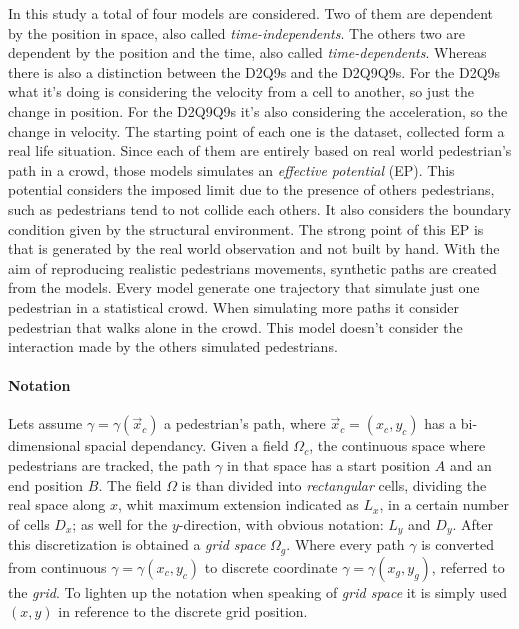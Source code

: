 \documentclass[class=article, crop=false]{standalone}
\begin{document}
In this study a total of four models are considered. %
Two of them are dependent by the position in space, also called \emph{time-independents}.
The others two are dependent by the position and the time, also called \emph{time-dependents}.
Whereas there is also a distinction between the D2Q9s and the D2Q9Q9s.
For the D2Q9s what it's doing is considering the velocity from a cell to another, so just the change in position.
For the D2Q9Q9s it's also considering the acceleration, so the change in velocity.
The starting point of each one is the dataset, collected form a real life situation.
Since each of them are entirely based on real world pedestrian's path in a crowd, those models simulates an \emph{effective potential} (EP).
This potential considers the imposed limit due to the presence of others pedestrians, such as pedestrians tend to not collide each others.
It also considers the boundary condition given by the structural environment.
The strong point of this EP is that is generated by the real world observation and not built by hand.
With the aim of reproducing realistic pedestrians movements, synthetic paths are created from the models.
Every model generate one trajectory that simulate just one pedestrian in a statistical crowd.
When simulating more paths it consider pedestrian that walks alone in the crowd.
This model doesn't consider the interaction made by the others simulated pedestrians.

\paragraph{Notation} Lets assume $\gamma=\gamma( \vec x_c)$ a pedestrian's path, where $\vec x_c = (x_c, y_c)$ has a bi-dimensional spacial dependancy.
Given a field $\Omega_c$, the continuous space where pedestrians are tracked, the path $\gamma$ in that space has a start position $A$ and an end position $B$.
The field $\Omega$ is than divided into \emph{rectangular} cells, dividing the real space along $x$, whit maximum extension indicated as $L_x$, in a certain number of cells $D_x$; 
as well for the $y$-direction, with obvious notation: $L_y$ and $D_y$.
After this discretization is obtained a \emph{grid space} $\Omega_g$.
Where every path $\gamma$ is converted from continuous $\gamma=\gamma(x_c, y_c)$ to discrete coordinate $\gamma=\gamma(x_g, y_g)$, referred to the \emph{grid}.
To lighten up the notation when speaking of \emph{grid space} it is simply used $(x, y)$ in reference to the discrete grid position.
\end{document}
